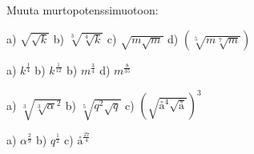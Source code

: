 Muuta murtopotenssimuotoon:

\begin{tehtava}
a) $\sqrt{\sqrt{k}}$ \qquad
b) $\sqrt[3]{\sqrt[4]{k}}$ \qquad
c) $\sqrt{m\sqrt{m}}$ \qquad
d) $(\sqrt[5]{m\sqrt[7]{m}})$ \qquad
\begin{vastaus}	
a) $k^\frac{1}{4}$ \qquad
b) $k^\frac{1}{12}$ \qquad
b) $m^\frac{3}{4}$ \qquad
d) $m^\frac{8}{35}$ 
\end{vastaus}
\end{tehtava}

\begin{tehtava}
a) $\sqrt[3]{\sqrt[3]{\alpha}^2}$ \qquad
b) $\sqrt[5]{q^2\sqrt{q}}$ \qquad
c) $(\sqrt{å^4\sqrt{å}})^3$ \qquad
\begin{vastaus}	
a) $\alpha^\frac{2}{9}$ \qquad
b) $q^\frac{1}{2}$ \qquad
c) $å^\frac{27}{4}$
\end{vastaus}
\end{tehtava}